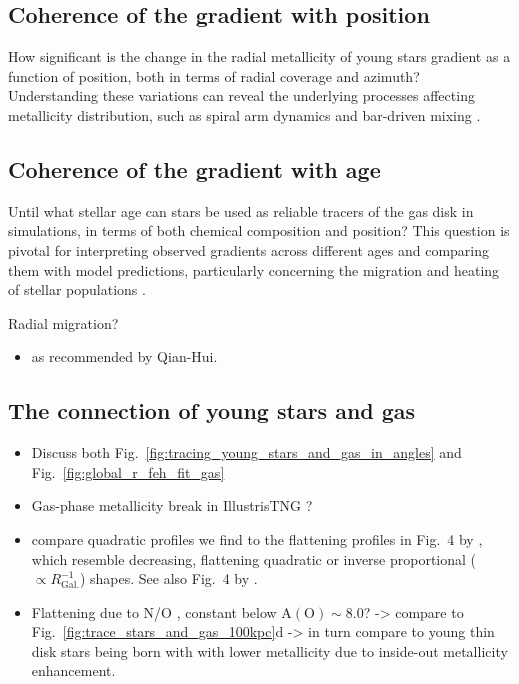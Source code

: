 \documentclass[fleqn,usenatbib]{mnras}
\begin{document}
\subsection{Coherence of the gradient with position} \label{sec:discussion_coherence_position}

How significant is the change in the radial metallicity of young stars gradient as a function of position, both in terms of radial coverage and azimuth? Understanding these variations can reveal the underlying processes affecting metallicity distribution, such as spiral arm dynamics and bar-driven mixing \citep[see their Figs. 5-8][]{DiMatteo2013}.

\subsection{Coherence of the gradient with age} \label{sec:discussion_coherence_age}

Until what stellar age can stars be used as reliable tracers of the gas disk in simulations, in terms of both chemical composition and position? This question is pivotal for interpreting observed gradients across different ages \citep[e.g.][]{Willett2023} and comparing them with model predictions, particularly concerning the migration and heating of stellar populations \citep{Binney2008, Frankel2018}.

Radial migration?
\begin{itemize}
    \item \citet{Grand2016} as recommended by Qian-Hui.
\end{itemize}

\subsection{The connection of young stars and gas}

\begin{itemize}
    \item Discuss both Fig.~\ref{fig:tracing_young_stars_and_gas_in_angles} and Fig.~\ref{fig:global_r_feh_fit_gas}
    \item Gas-phase metallicity break in IllustrisTNG \citep{Hemler2021, Garcia2023}?
    \item compare quadratic profiles we find to the flattening profiles in Fig.~4 by \citet{Hemler2021}, which resemble decreasing, flattening quadratic or inverse proportional ($\propto R_\mathrm{Gal.}^{-1}$) shapes. See also Fig.~4 by \citet{Garcia2023}.
    \item Flattening due to N/O \citep{Grasha2022}, constant below $\mathrm{A(O)} \sim 8.0$? -> compare to Fig.~\ref{fig:trace_stars_and_gas_100kpc}d -> in turn compare to young thin disk stars being born with with lower metallicity due to inside-out metallicity enhancement.
\end{itemize}
\end{document}
